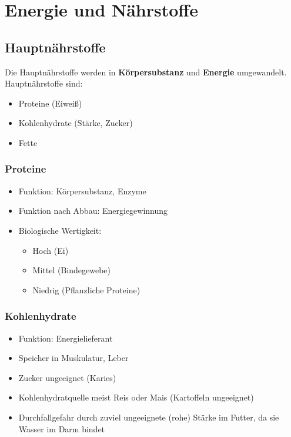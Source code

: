 \section{Energie und Nährstoffe}

    \subsection{Hauptnährstoffe}
        Die Hauptnährstoffe werden in \textbf{Körpersubstanz} und \textbf{Energie} umgewandelt. \\
        Hauptnährstoffe sind:
        \begin{itemize}
            \item Proteine (Eiweiß)
            \item Kohlenhydrate (Stärke, Zucker)
            \item Fette
        \end{itemize}

        \subsubsection{Proteine}
            \begin{itemize}
                \item Funktion: Körpersubstanz, Enzyme
                \item Funktion nach Abbau: Energiegewinnung
                \item Biologische Wertigkeit:
                \begin{itemize}
                    \item Hoch (Ei)
                    \item Mittel (Bindegewebe)
                    \item Niedrig (Pflanzliche Proteine)
                \end{itemize}
            \end{itemize}

        \subsubsection{Kohlenhydrate}
            \begin{itemize}
                \item Funktion: Energielieferant
                \item Speicher in Muskulatur, Leber
                \item Zucker ungeeignet (Karies)
                \item Kohlenhydratquelle meist Reis oder Mais (Kartoffeln ungeeignet)
                \item Durchfallgefahr durch zuviel ungeeignete (rohe) Stärke im Futter, da sie Wasser im Darm bindet
            \end{itemize}

